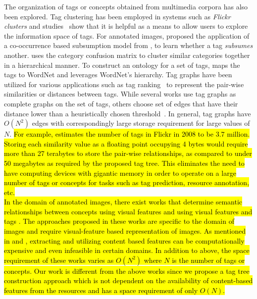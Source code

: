 {{%
The organization of tags or concepts obtained from multimedia corpora has also been explored. Tag clustering has been employed in systems such as \textit{Flickr clusters} \cite{FlickrClusters} and studies~\cite{Begelman06automatedtag} show that it is helpful as a means to allow users to explore the information space of tags. For annotated images, \cite{SubsumptionFlickr} proposed the application of a co-occurrence based subsumption model from \cite{sanderson1999deriving}, to learn whether a tag {\em subsumes} another. \cite{griffin2008learning} uses the category confusion matrix to cluster similar categories together in a hierarchical manner. To construct an ontology for a set of tags, \cite{WordnetHierarchyConstruct} maps the tags to WordNet and leverages WordNet's hierarchy. Tag graphs have been utilized for various applications such as tag ranking~\cite{liu2009tag} to represent the pair-wise similarities or distances between tags. While several works use tag graphs as complete graphs on the set of tags, others choose set of edges that have their distance lower than a heuristically chosen threshold~\cite{heymann2006collaborative}. In general, tag graphs have $O(N^2)$ edges with correspondingly large storage requirement for large values of $N$. \hl{For example, {\cite{sigurbjornsson2008flickr}} estimates the number of tags in Flickr in 2008 to be 3.7 million. Storing each similarity value as a floating point occupying 4 bytes would require more than 27 terabytes to store the pair-wise relationships, as compared to under 50 megabytes as required by the proposed tag tree. This eliminates the need to have computing devices with gigantic memory in order to operate on a large number of tags or concepts for tasks such as tag prediction, resource annotation, etc.  \\ 
\indent In the domain of annotated images, there exist works that determine semantic relationships between concepts using visual features {\cite{wu2008flickr}} and using visual features and tags {\cite{katsurai2013cross}}. 
The approaches proposed in these works are specific to the domain of images and require visual-feature based representation of images. As mentioned in {\cite{huang2010text}\cite{song2010taxonomic}\cite{zanetti2008walk}} and {\cite{yin2009exploring}}, extracting and utilizing content based features can be computationally expensive and even infeasible in certain domains. In addition to above, the space requirement of these works varies as $O(N^2)$ where $N$ is the number of tags or concepts. Our work is different from the above works since we propose a tag tree construction approach which is not dependent on the availability of content-based features from the resources and has a space requirement of only $O(N)$. 
}}}
